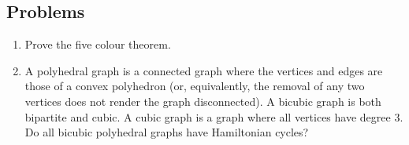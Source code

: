 \subsection{Problems}

\begin{enumerate}
\item Prove the five colour theorem.
\item A polyhedral graph is a connected graph where the vertices and edges are those of a convex polyhedron (or, equivalently, the removal of any two vertices does not render the graph disconnected). A bicubic graph is both bipartite and cubic. A cubic graph is a graph where all vertices have degree 3. Do all bicubic polyhedral graphs have Hamiltonian cycles?
\end{enumerate}
